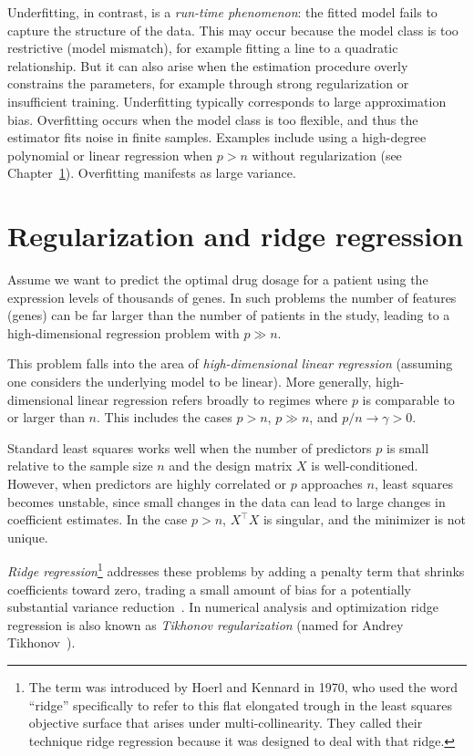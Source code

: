 Underfitting, in contrast, is a {\em run-time phenomenon}: the fitted model fails to capture the structure of the data. This may occur because the model class is too restrictive (model mismatch), for example fitting a line to a quadratic relationship. But it can also arise when the estimation procedure overly constrains the parameters, for example through strong regularization or insufficient training. Underfitting typically corresponds to large approximation bias.
Overfitting occurs when the model class is too flexible, and thus the estimator fits noise in finite samples. Examples include using a high-degree polynomial or  linear regression when $p > n$ without regularization (see Chapter~\ref{ss:ridge}).
Overfitting manifests as large variance. 








\section{Regularization and ridge regression}\label{ss:ridge}

Assume we want to predict the optimal drug dosage for a patient using the expression levels of thousands of genes. In such problems the number of features (genes) can be far larger than the number of patients in the study, leading to a high-dimensional regression problem with $p \gg n$.

This problem falls into the area of  {\em high-dimensional linear regression} (assuming one considers the underlying model to be linear). More generally, high-dimensional linear regression refers broadly to regimes where $p$ is comparable to or larger than $n$. This includes the cases $p > n$, $p \gg n$, and $p/n \to \gamma > 0$.

Standard least squares works well when the number of predictors $p$ is  small relative to the sample size $n$ and the design matrix $X$ is well-conditioned. 
However, when predictors are highly correlated or $p$ approaches $n$, least squares becomes 
unstable, since small changes in the data can lead to large changes in coefficient estimates. 
In the  case $p > n$, %
$X^\top X$ is singular, and the minimizer is not unique.

\smallskip

{\em Ridge regression}\footnote{The term was introduced by Hoerl and Kennard in 1970, who used the word ``ridge'' specifically to refer to this flat elongated trough in the least squares objective surface that arises under multi-collinearity. They called their technique ridge regression because it was designed to deal with that ridge.} addresses these problems by adding a penalty term that shrinks coefficients toward zero, trading a small amount of bias for a potentially substantial variance 
reduction~\cite{hoerl1970ridge,hastieelements}. In numerical analysis and optimization ridge regression is also known as {\em Tikhonov regularization} (named for Andrey Tikhonov~\cite{tikhonov1963solution}).

